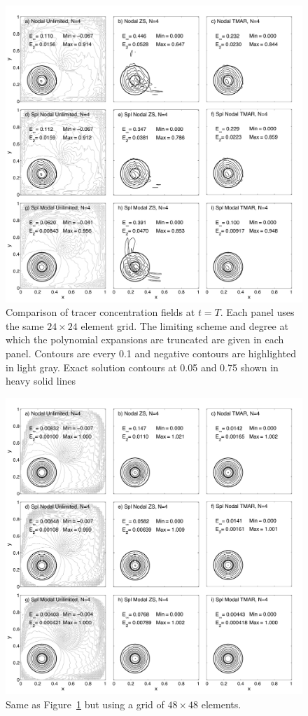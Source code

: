 \documentclass{ametsoc}
\begin{document}
\begin{figure}[t]
\includegraphics[width=\textwidth]{figs/2d/_defCosbell_9pan_24e.pdf}
\caption{Comparison of tracer concentration fields at $t=T$. Each panel uses the same $24\times24$ element grid. The limiting scheme and degree at which the polynomial expansions are truncated are given in each panel. Contours are every 0.1 and negative contours are highlighted in light gray. Exact solution contours at 0.05 and 0.75 shown in heavy solid lines}\label{fig:2dCosbell24}
\end{figure}

\begin{figure}[t]
\includegraphics[width=\textwidth]{figs/2d/_defCosbell_9pan_48e.pdf}
\caption{Same as Figure~\ref{fig:2dCosbell24} but using a grid of $48\times48$ elements.}\label{fig:2dCosbell48}
\end{figure}
\end{document}
